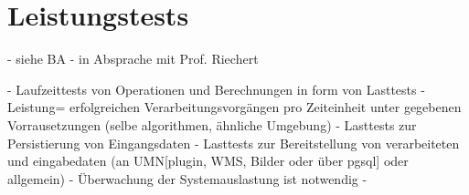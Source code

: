 \section{Leistungstests}

- siehe BA
- in Absprache mit Prof. Riechert

- Laufzeittests von Operationen und Berechnungen in form von Lasttests
- Leistung=  erfolgreichen Verarbeitungsvorgängen pro Zeiteinheit unter gegebenen Vorrausetzungen (selbe algorithmen, ähnliche Umgebung)
- Lasttests zur Persistierung von Eingangsdaten
- Lasttests zur Bereitstellung von verarbeiteten und eingabedaten (an UMN[plugin, WMS, Bilder oder über pgsql] oder allgemein)
- Überwachung der Systemauslastung ist notwendig
- 